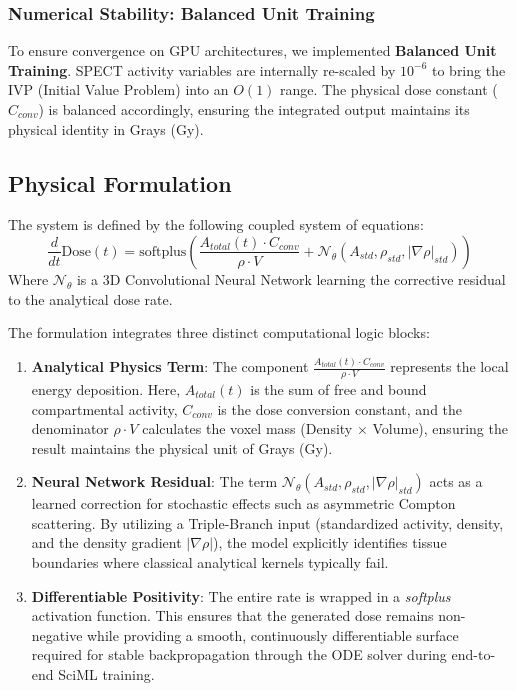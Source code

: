 \documentclass[a4paper,10pt]{elsarticle}
\begin{document}
\subsubsection{Numerical Stability: Balanced Unit Training}
To ensure convergence on GPU architectures, we implemented \textbf{Balanced Unit Training}. SPECT activity variables are internally re-scaled by $10^{-6}$ to bring the IVP (Initial Value Problem) into an $O(1)$ range. The physical dose constant ($C_{conv}$) is balanced accordingly, ensuring the integrated output maintains its physical identity in Grays (Gy).

\subsection{Physical Formulation}
The system is defined by the following coupled system of equations:
\begin{equation}
    \frac{d}{dt} \text{Dose}(t) = \text{softplus} \left( \frac{A_{total}(t) \cdot C_{conv}}{\rho \cdot V} + \mathcal{N}_\theta(A_{std}, \rho_{std}, |\nabla \rho|_{std}) \right)
\end{equation}
Where $\mathcal{N}_\theta$ is a 3D Convolutional Neural Network learning the corrective residual to the analytical dose rate. 

The formulation integrates three distinct computational logic blocks:
\begin{enumerate}
    \item \textbf{Analytical Physics Term}: The component $\frac{A_{total}(t) \cdot C_{conv}}{\rho \cdot V}$ represents the local energy deposition. Here, $A_{total}(t)$ is the sum of free and bound compartmental activity, $C_{conv}$ is the dose conversion constant, and the denominator $\rho \cdot V$ calculates the voxel mass (Density $\times$ Volume), ensuring the result maintains the physical unit of Grays (Gy).
    \item \textbf{Neural Network Residual}: The term $\mathcal{N}_\theta(A_{std}, \rho_{std}, |\nabla \rho|_{std})$ acts as a learned correction for stochastic effects such as asymmetric Compton scattering. By utilizing a Triple-Branch input (standardized activity, density, and the density gradient $|\nabla \rho|$), the model explicitly identifies tissue boundaries where classical analytical kernels typically fail.
    \item \textbf{Differentiable Positivity}: The entire rate is wrapped in a \textit{softplus} activation function. This ensures that the generated dose remains non-negative while providing a smooth, continuously differentiable surface required for stable backpropagation through the ODE solver during end-to-end SciML training.
\end{enumerate}
\end{document}
